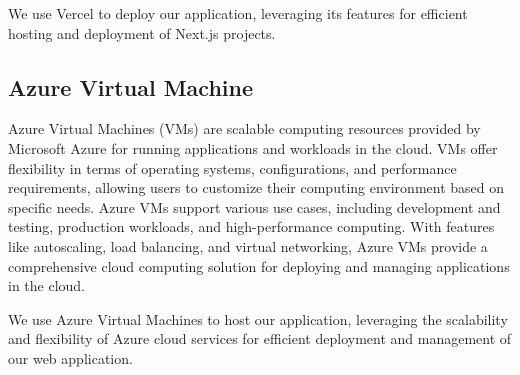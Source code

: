We use Vercel to deploy our application, leveraging its features for
efficient hosting and deployment of Next.js projects.

\subsection{Azure Virtual Machine}
Azure Virtual Machines (VMs) are scalable computing resources provided by
Microsoft Azure for running applications and workloads in the cloud. VMs offer
flexibility in terms of operating systems, configurations, and performance
requirements, allowing users to customize their computing environment based on
specific needs. Azure VMs support various use cases, including development and
testing, production workloads, and high-performance computing. With features like
autoscaling, load balancing, and virtual networking, Azure VMs provide a
comprehensive cloud computing solution for deploying and managing applications
in the cloud.

We use Azure Virtual Machines to host our application, leveraging the
scalability and flexibility of Azure cloud services for efficient
deployment and management of our web application.